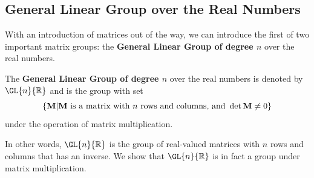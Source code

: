 \subsection{General Linear Group over the Real Numbers}
With an introduction of matrices out of the way, we can introduce the first of two important matrix groups: the \textbf{General Linear Group of degree $n$} over the real numbers.
\begin{definition}
    The \textbf{General Linear Group of degree $n$} over the real numbers is denoted by $\GL{n}{\mathbb{R}}$ and is the group with set
    \[
        \left\{\textbf{M} \vert \text{\textbf{M} is a matrix with } n \text{ rows and columns, and } \det \textbf{M} \neq 0\right\}
    \]
    under the operation of matrix multiplication.
\end{definition}
In other words, $\GL{n}{\mathbb{R}}$ is the group of real-valued matrices with $n$ rows and columns that has an inverse. We show that $\GL{n}{\mathbb{R}}$ is in fact a group under matrix multiplication.
